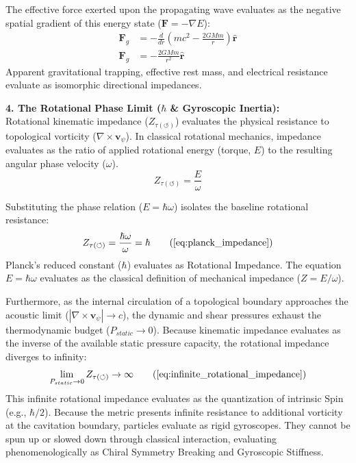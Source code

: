 The effective force exerted upon the propagating wave evaluates as the negative spatial gradient of this energy state ($\mathbf{F} = -\nabla E$):
\begin{align}
    \mathbf{F}_g &= -\frac{d}{dr} \left( mc^2 - \frac{2GMm}{r} \right) \mathbf{\hat{r}} \\ 
    \mathbf{F}_g &= -\frac{2GMm}{r^2} \mathbf{\hat{r}} \label{eq:relativistic_limit}
\end{align}
Apparent gravitational trapping, effective rest mass, and electrical resistance evaluate as isomorphic directional impedances.

\vspace{0.2 cm}

\textbf{4. The Rotational Phase Limit ($\hbar$ \& Gyroscopic Inertia):} \\
Rotational kinematic impedance ($Z_{\tau(\circlearrowleft)}$) evaluates the physical resistance to topological vorticity ($\nabla \times \mathbf{v}_{\psi}$). In classical rotational mechanics, impedance evaluates as the ratio of applied rotational energy (torque, $E$) to the resulting angular phase velocity ($\omega$).
\begin{equation}
    Z_{\tau(\circlearrowleft)} = \frac{E}{\omega}
\end{equation}

Substituting the phase relation ($E = \hbar\omega$) isolates the baseline rotational resistance: 
\begin{equation}
    Z_{\tau(\circlearrowleft)} = \frac{\hbar\omega}{\omega} = \hbar \tag{\ref{eq:planck_impedance}}
\end{equation}
Planck's reduced constant ($\hbar$) evaluates as Rotational Impedance. The equation $E = \hbar\omega$ evaluates as the classical definition of mechanical impedance ($Z = E/\omega$). 

Furthermore, as the internal circulation of a topological boundary approaches the acoustic limit ($|\nabla \times \mathbf{v}_{\psi}| \to c$), the dynamic and shear pressures exhaust the thermodynamic budget ($P_{static} \to 0$). Because kinematic impedance evaluates as the inverse of the available static pressure capacity, the rotational impedance diverges to infinity: 
\begin{equation}
    \lim_{P_{static} \to 0} Z_{\tau(\circlearrowleft)} \to \infty \tag{\ref{eq:infinite_rotational_impedance}}
\end{equation}
This infinite rotational impedance evaluates as the quantization of intrinsic Spin (e.g., $\hbar/2$). Because the metric presents infinite resistance to additional vorticity at the cavitation boundary, particles evaluate as rigid gyroscopes. They cannot be spun up or slowed down through classical interaction, evaluating phenomenologically as Chiral Symmetry Breaking and Gyroscopic Stiffness.

